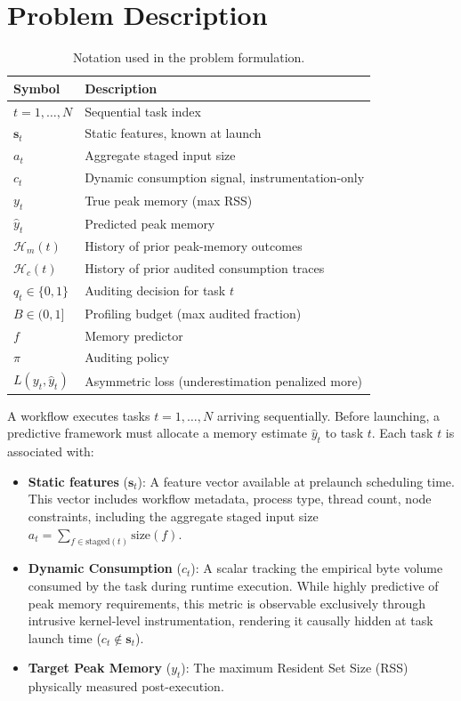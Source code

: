 \section{Problem Description}
\label{sec:problem}

\begin{table}[t]
\centering
\caption{Notation used in the problem formulation.}
\label{tab:notation}
\footnotesize
\begin{tabular}{@{}l p{5.6cm}@{}}
\toprule
\textbf{Symbol} & \textbf{Description} \\
\midrule
$t = 1,\dots,N$ & Sequential task index \\
$\mathbf{s}_t$ & Static features, known at launch \\
$a_t$ & Aggregate staged input size \\
$c_t$ & Dynamic consumption signal, instrumentation-only \\
$y_t$ & True peak memory (max RSS) \\
$\hat{y}_t$ & Predicted peak memory \\
$\mathcal{H}_m(t)$ & History of prior peak-memory outcomes \\
$\mathcal{H}_c(t)$ & History of prior audited consumption traces \\
$q_t \in \{0,1\}$ & Auditing decision for task $t$ \\
$B \in (0,1]$ & Profiling budget (max audited fraction) \\
$f$ & Memory predictor \\
$\pi$ & Auditing policy \\
$L(y_t,\hat{y}_t)$ & Asymmetric loss (underestimation penalized more) \\
\bottomrule
\end{tabular}
\end{table}


A workflow executes tasks $t = 1, \dots, N$ arriving sequentially. Before launching, a predictive framework must allocate a memory estimate $\hat{y}_t$ to task $t$. Each task $t$ is associated with:

\begin{itemize}%
\item \textbf{Static features} ($\mathbf{s}_t$): A feature vector available at prelaunch scheduling time. This vector includes workflow metadata, process type, thread count, node constraints, including the aggregate staged input size $a_t = \sum_{f \in \text{staged}(t)} \text{size}(f)$. 
\item \textbf{Dynamic Consumption} (\textbf{${c_{t}}$}):  A scalar tracking the empirical byte volume consumed by the task during runtime execution.  While highly predictive of peak memory requirements, this metric is observable exclusively through intrusive kernel-level instrumentation, rendering it causally hidden at task launch time ($c_t \notin \mathbf{s}_t$).

\item \textbf{Target Peak Memory} (\textbf{${y_t}$}): The maximum Resident Set Size (RSS) physically measured post-execution.
\end{itemize}

